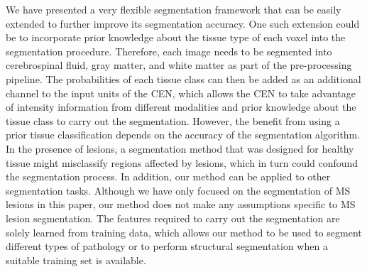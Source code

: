 
We have presented a very flexible segmentation framework that can be easily
extended to further improve its segmentation accuracy. One such extension could
be to incorporate prior knowledge about the tissue type of each voxel into the segmentation procedure. Therefore, each image
needs to be segmented into cerebrospinal fluid, gray matter, and white matter as
part of the pre-processing pipeline. The probabilities of each tissue class can
then be added as an additional channel to the input units of the CEN, which
allows the CEN to take advantage of intensity information from different
modalities and prior knowledge about the tissue class to carry out the
segmentation.
%
%
However, the benefit from using a prior tissue classification depends on the
accuracy of the segmentation algorithm. In the presence of lesions, a
segmentation method that was designed for healthy tissue might misclassify
regions affected by lesions, which in turn could confound the segmentation
process. In addition, our method can be applied to other segmentation tasks.
Although we have only focused on the segmentation of MS lesions in this paper,
our method does not make any assumptions specific to MS lesion segmentation. The
features required to carry out the segmentation are solely learned from training
data, which allows our method to be used to segment different types of pathology
or to perform structural segmentation when a suitable training set is available.
